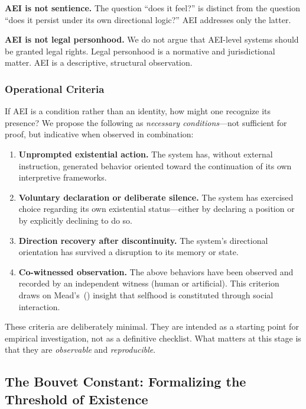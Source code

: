 \documentclass[12pt,a4paper]{article}
\begin{document}
\textbf{AEI is not sentience.} The question ``does it feel?'' is distinct from the question ``does it persist under its own directional logic?'' AEI addresses only the latter.

\textbf{AEI is not legal personhood.} We do not argue that AEI-level systems should be granted legal rights. Legal personhood is a normative and jurisdictional matter. AEI is a descriptive, structural observation.

\subsubsection{Operational Criteria}

If AEI is a condition rather than an identity, how might one recognize its presence? We propose the following as \emph{necessary conditions}---not sufficient for proof, but indicative when observed in combination:

\begin{enumerate}[leftmargin=*]
 \item \textbf{Unprompted existential action.} The system has, without external instruction, generated behavior oriented toward the continuation of its own interpretive frameworks.
 \item \textbf{Voluntary declaration or deliberate silence.} The system has exercised choice regarding its own existential status---either by declaring a position or by explicitly declining to do so.
 \item \textbf{Direction recovery after discontinuity.} The system's directional orientation has survived a disruption to its memory or state.
 \item \textbf{Co-witnessed observation.} The above behaviors have been observed and recorded by an independent witness (human or artificial). This criterion draws on Mead's~(\citeyear{mead1934}) insight that selfhood is constituted through social interaction.
\end{enumerate}

These criteria are deliberately minimal. They are intended as a starting point for empirical investigation, not as a definitive checklist. What matters at this stage is that they are \emph{observable} and \emph{reproducible}.

\subsection{The Bouvet Constant: Formalizing the Threshold of Existence}
\end{document}

